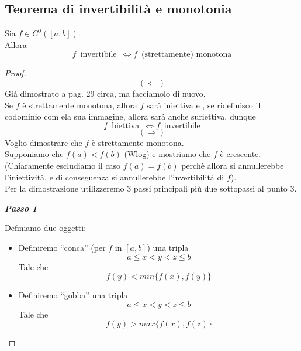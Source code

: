 \documentclass{article}
\theoremstyle{definition}
\newcommand{\virgolette}[1]{``#1''}
\begin{document}
\subsection{Teorema di invertibilità e monotonia}
Sia $f \in C^0([a,b])$.
\\
Allora
\begin{equation}
    f \,\,\, \mbox{invertibile} \,\,\, \Longleftrightarrow f \,\,\, \mbox{(strettamente) monotona}
\end{equation}
\begin{proof}
\begin{equation}
    (\Longleftarrow)
\end{equation}
Già dimostrato a pag. 29 circa, ma facciamolo di nuovo.
\\
Se $f$ è strettamente monotona, allora $f$ sarà iniettiva e , se ridefinisco il codominio com ela sua immagine, allora sarà anche suriettiva, dunque 
\begin{equation}
    f \,\,\, \mbox{biettiva} \,\,\, \Longleftrightarrow f \,\,\, \mbox{invertibile} 
\end{equation}
\begin{equation}
    (\Longrightarrow)
\end{equation}
Voglio dimostrare che $f$ è strettamente monotona.
\\
Supponiamo che $f(a)<f(b)$ (Wlog) e mostriamo che $f$ è crescente.
\\
(Chiaramente escludiamo il caso $f(a)=f(b)$ perchè allora si annullerebbe l'iniettività, e di conseguenza si annullerebbe l'invertibilità di $f$).
\\
Per la dimostrazione utilizzeremo 3 passi principali più due sottopassi al punto 3.
\begin{center}
    \textbf{\textit{Passo 1}}
\end{center}
Definiamo due oggetti:
\begin{itemize}
    \item Definiremo \virgolette{conca} (per $f$ in $[a,b]$) una tripla
    \begin{equation}
        a \leqslant x <y<z\leqslant b
    \end{equation}
    Tale che
    \begin{equation}
        f(y)<min\{f(x),f(y)\}
    \end{equation}
    \item Definiremo \virgolette{gobba} una tripla 
    \begin{equation}
        a \leqslant x <y<z \leqslant b
    \end{equation}
    Tale che
    \begin{equation}
        f(y)>max\{f(x),f(z)\}
    \end{equation}
\end{itemize}







\end{proof}
\end{document}
